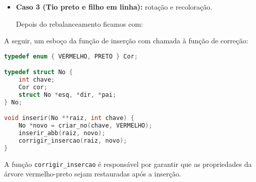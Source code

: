 \begin{itemize}
    \item \textbf{Caso 3 (Tio preto e filho em linha):} rotação e recoloração.

    \begin{center}
	\end{center}

	Depois do rebalanceamento ficamos com:

	\begin{center}
	\end{center}

\end{itemize}


A seguir, um esboço da função de inserção com chamada à função de correção:

\begin{lstlisting}[language=C, caption={Inserção em árvore vermelho-preto (esboço)}, label=lst:insercao_rb]
typedef enum { VERMELHO, PRETO } Cor;

typedef struct No {
    int chave;
    Cor cor;
    struct No *esq, *dir, *pai;
} No;

void inserir(No **raiz, int chave) {
    No *novo = criar_no(chave, VERMELHO);
    inserir_abb(raiz, novo);
    corrigir_insercao(raiz, novo);
}
\end{lstlisting}

A função \texttt{corrigir\_insercao} é responsável por garantir que as propriedades da árvore vermelho-preto sejam restauradas após a inserção.

